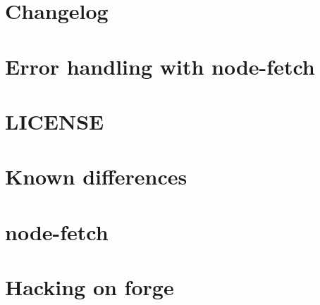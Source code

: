 \documentclass[twoside]{book}
\newcommand{\+}{\discretionary{\mbox{\scriptsize$\hookleftarrow$}}{}{}}
\begin{document}
\chapter{Changelog}
\label{md__c_1_workspace_demo_src_main_script_node_modules_node-fetch__c_h_a_n_g_e_l_o_g}

\chapter{Error handling with node-\/fetch}
\label{md__c_1_workspace_demo_src_main_script_node_modules_node-fetch__e_r_r_o_r-_h_a_n_d_l_i_n_g}

\chapter{L\+I\+C\+E\+N\+SE}
\label{md__c_1_workspace_demo_src_main_script_node_modules_node-fetch__l_i_c_e_n_s_e}

\chapter{Known differences}
\label{md__c_1_workspace_demo_src_main_script_node_modules_node-fetch__l_i_m_i_t_s}

\chapter{node-\/fetch}
\label{md__c_1_workspace_demo_src_main_script_node_modules_node-fetch__r_e_a_d_m_e}

\chapter{Hacking on forge}
\label{md__c_1_workspace_demo_src_main_script_node_modules_node-forge__h_a_c_k_i_n_g}

\end{document}

